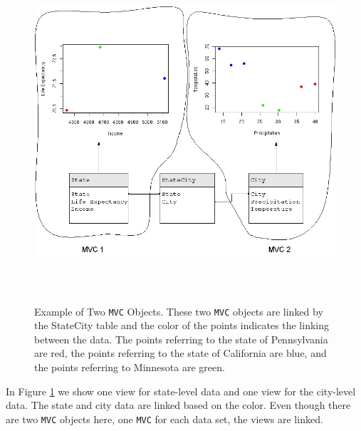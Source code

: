 \documentclass{article}[11pt]
\newcommand{\Robject}[1]{{\texttt{#1}}}
\begin{document}
\begin{figure}[ht]
  \begin{center}
    \includegraphics[height=5in, width=6in]{MultipleMVC.jpg}
    \caption{ Example of Two \Robject{MVC} Objects.  These two \Robject{MVC}
      objects are linked by the StateCity table and the color of the points
    indicates the linking between the data.  The points referring to the state
    of Pennsylvania are red, the points referring to the state of California
    are blue, and the points referring to Minnesota are green. }
    \label{Fig:MultMVC}
  \end{center}
\end{figure}

In Figure \ref{Fig:MultMVC} we show one view for state-level data and
one view for the city-level data.  The state and city data are linked
based on the color.  Even though there are two \Robject{MVC} objects
here, one \Robject{MVC} for each data set, the views are linked.

\end{document}
